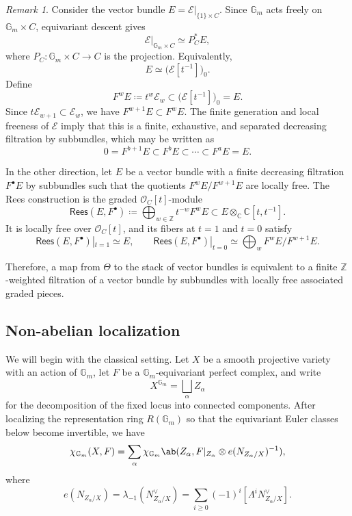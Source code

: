 \documentclass{amsart}
\theoremstyle{definition}
\theoremstyle{remark}
\newtheorem{rmk}[thm]{Remark}
\theoremstyle{plain}
\theoremstyle{definition}
\theoremstyle{remark}
\newcommand{\G}{\mathbb{G}}
\newcommand{\C}{\mathbb{C}}
\newcommand{\Z}{\mathbb{Z}}
\newcommand{\mc}[1]{\mathcal{#1}}
\newcommand{\ms}[1]{\mathsf{#1}}
\newcommand{\1}{\mathbf{1}}
\newcommand{\2}{\mathbf{2}}
\newcommand{\3}{\mathbf{3}}
\begin{document}
\begin{rmk}
    Consider the vector bundle \(E=\mc{E}|_{\{1\}\times C}\). Since \(\G_m\) acts freely on \(\G_m\times C\), equivariant descent gives
    \[
        \mc{E}|_{\G_m\times C}\simeq P_C^*E,
    \]
    where \(P_C\colon\G_m\times C\to C\) is the projection. Equivalently,
    \[
        E\simeq\big(\mc{E}[t^{-1}]\big)_0.
    \]
    Define
    \[
        F^wE\coloneqq t^w\mc{E}_w\subset\big(\mc{E}[t^{-1}]\big)_0=E.
    \]
    Since \(t\mc{E}_{w+1}\subset\mc{E}_w\), we have \(F^{w+1}E\subset F^wE\). The finite generation and local freeness of \(\mc{E}\) imply that this is a finite, exhaustive, and separated decreasing filtration by subbundles, which may be written as
    \[
        0=F^{b+1}E\subset F^bE\subset\cdots\subset F^aE=E.
    \]

    In the other direction, let \(E\) be a vector bundle with a finite decreasing filtration \(F^\bullet E\) by subbundles such that the quotients \(F^wE/F^{w+1}E\) are locally free. The Rees construction is the graded \(\mc{O}_C[t]\)-module
    \[
        \ms{Rees}(E,F^\bullet)
        \coloneqq
        \bigoplus_{w\in\Z}t^{-w}F^wE
        \subset
        E\otimes_{\C}\C[t,t^{-1}].
    \]
    It is locally free over \(\mc{O}_C[t]\), and its fibers at \(t=1\) and \(t=0\) satisfy
    \[
        \ms{Rees}(E,F^\bullet)|_{t=1}\simeq E,
        \qquad
        \ms{Rees}(E,F^\bullet)|_{t=0}
        \simeq
        \bigoplus_w F^wE/F^{w+1}E.
    \]
\end{rmk}

Therefore, a map from \(\Theta\) to the stack of vector bundles is equivalent to a finite \(\Z\)-weighted filtration of a vector bundle by subbundles with locally free associated graded pieces.


\subsection{Non-abelian localization}%
\label{sub:Non-abelian localization}

We will begin with the classical setting. Let \(X\) be a smooth projective variety with an action of \(\G_m\), let \(F\) be a \(\G_m\)-equivariant perfect complex, and write
\[
    X^{\G_m}=\bigsqcup_\alpha Z_\alpha
\]
for the decomposition of the fixed locus into connected components. After localizing the representation ring \(R(\G_m)\) so that the equivariant Euler classes below become invertible, we have
\[
    \chi_{\G_m}(X,F)
    =
    \sum_\alpha
    \chi_{\G_m}\ab(
        Z_\alpha,
        F|_{Z_\alpha}\otimes e(N_{Z_\alpha/X})^{-1}
    ),
\]
where
\[
    e(N_{Z_\alpha/X})
    =
    \lambda_{-1}(N_{Z_\alpha/X}^\vee)
    =
    \sum_{i\geq0}(-1)^i[\Lambda^iN_{Z_\alpha/X}^\vee].
\]
\end{document}
